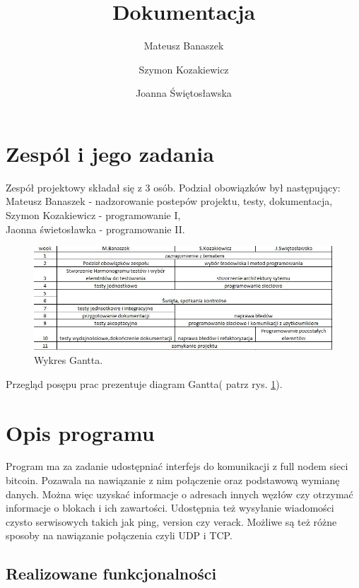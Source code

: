 \documentclass[a4paper,polish,12pt]{article}
\title{Dokumentacja}
\author{Mateusz Banaszek \and Szymon Kozakiewicz \and Joanna Świętosławska}
\begin{document}
\maketitle
\section{Zespól i jego zadania}
Zespół projektowy składał się z 3 osób.  Podział obowiązków był następujący:\\
Mateusz Banaszek - nadzorowanie postepów projektu, testy, dokumentacja,\\
Szymon Kozakiewicz - programowanie I,\\
Jaonna świetosławka - programowanie II.


\begin{figure}


\label{zdj:2}
\centering
\includegraphics[width=\textwidth]{1.jpg}
\caption{Wykres Gantta.}
\end{figure}

Przegląd posępu prac prezentuje diagram Gantta( patrz rys. \ref{zdj:2}). 

\section{Opis programu}
Program ma za zadanie udostępniać interfejs do komunikacji z full nodem sieci bitcoin. Pozawala na nawiązanie z nim połączenie oraz podstawową wymianę danych. Można więc uzyskać informacje o adresach innych węzłów czy otrzymać informacje o blokach i ich zawartości. Udostępnia też wysyłanie wiadomości czysto serwisowych takich jak ping, version czy verack. Możliwe są też różne sposoby na nawiązanie połączenia czyli UDP i TCP. 

\subsection{Realizowane funkcjonalności}
\end{document}
